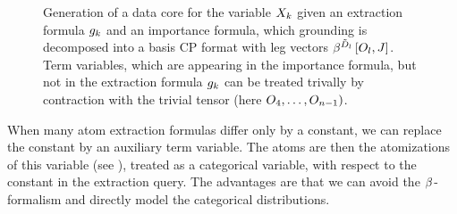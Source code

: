 


\begin{figure}[t]
    \begin{center}
        
    \end{center}
    \caption{Generation of a data core for the variable $X_{k}$ given an extraction formula $g_{k}$ and an importance formula, which grounding is decomposed into a basis CP format with leg vectors $\beta^{\tilde{D}_{l}}\left[O_{l},J\right]$.
    Term variables, which are appearing in the importance formula, but not in the extraction formula $g_{k}$ can be treated trivally by contraction with the trivial tensor (here $O_{4},\ldots,O_{n-1})$.
    }
    \label{fig:datacoreGeneration}
\end{figure}


When many atom extraction formulas differ only by a constant, we can replace the constant by an auxiliary term variable.
The atoms are then the atomizations of this variable (see ), treated as a categorical variable, with respect to the constant in the extraction query.
The advantages are that we can avoid the $\beta^{}$-formalism and directly model the categorical distributions.

